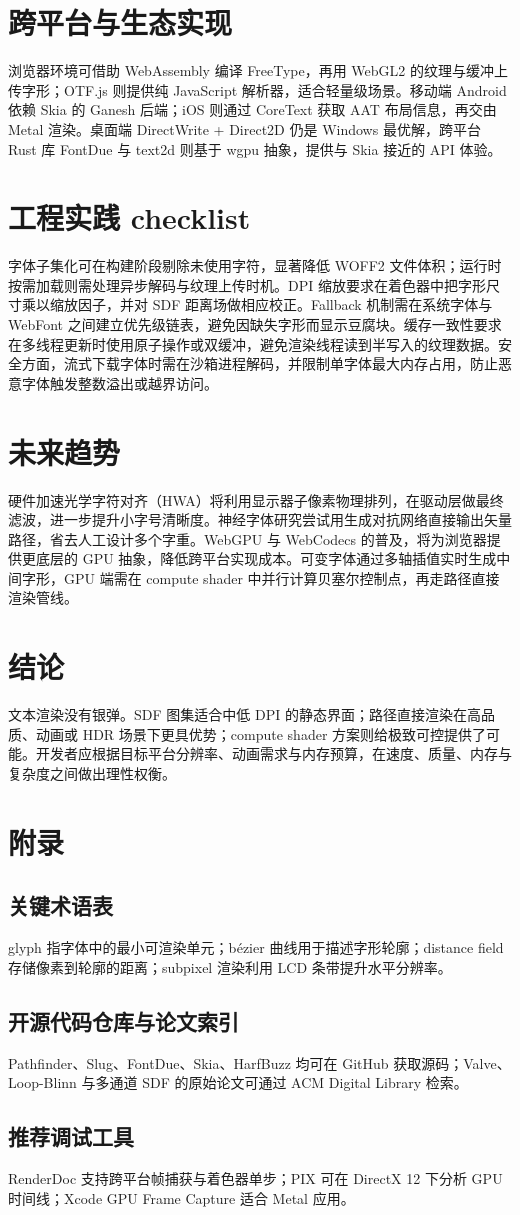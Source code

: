 \chapter{跨平台与生态实现}
浏览器环境可借助 WebAssembly 编译 FreeType，再用 WebGL2 的纹理与缓冲上传字形；OTF.js 则提供纯 JavaScript 解析器，适合轻量级场景。移动端 Android 依赖 Skia 的 Ganesh 后端；iOS 则通过 CoreText 获取 AAT 布局信息，再交由 Metal 渲染。桌面端 DirectWrite + Direct2D 仍是 Windows 最优解，跨平台 Rust 库 FontDue 与 text2d 则基于 wgpu 抽象，提供与 Skia 接近的 API 体验。\par
\chapter{工程实践 checklist}
字体子集化可在构建阶段剔除未使用字符，显著降低 WOFF2 文件体积；运行时按需加载则需处理异步解码与纹理上传时机。DPI 缩放要求在着色器中把字形尺寸乘以缩放因子，并对 SDF 距离场做相应校正。Fallback 机制需在系统字体与 WebFont 之间建立优先级链表，避免因缺失字形而显示豆腐块。缓存一致性要求在多线程更新时使用原子操作或双缓冲，避免渲染线程读到半写入的纹理数据。安全方面，流式下载字体时需在沙箱进程解码，并限制单字体最大内存占用，防止恶意字体触发整数溢出或越界访问。\par
\chapter{未来趋势}
硬件加速光学字符对齐（HWA）将利用显示器子像素物理排列，在驱动层做最终滤波，进一步提升小字号清晰度。神经字体研究尝试用生成对抗网络直接输出矢量路径，省去人工设计多个字重。WebGPU 与 WebCodecs 的普及，将为浏览器提供更底层的 GPU 抽象，降低跨平台实现成本。可变字体通过多轴插值实时生成中间字形，GPU 端需在 compute shader 中并行计算贝塞尔控制点，再走路径直接渲染管线。\par
\chapter{结论}
文本渲染没有银弹。SDF 图集适合中低 DPI 的静态界面；路径直接渲染在高品质、动画或 HDR 场景下更具优势；compute shader 方案则给极致可控提供了可能。开发者应根据目标平台分辨率、动画需求与内存预算，在速度、质量、内存与复杂度之间做出理性权衡。\par
\chapter{附录}
\section{关键术语表}
glyph 指字体中的最小可渲染单元；bézier 曲线用于描述字形轮廓；distance field 存储像素到轮廓的距离；subpixel 渲染利用 LCD 条带提升水平分辨率。\par
\section{开源代码仓库与论文索引}
Pathfinder、Slug、FontDue、Skia、HarfBuzz 均可在 GitHub 获取源码；Valve、Loop-Blinn 与多通道 SDF 的原始论文可通过 ACM Digital Library 检索。\par
\section{推荐调试工具}
RenderDoc 支持跨平台帧捕获与着色器单步；PIX 可在 DirectX 12 下分析 GPU 时间线；Xcode GPU Frame Capture 适合 Metal 应用。\par
